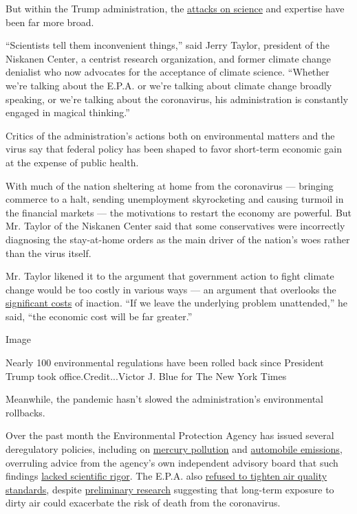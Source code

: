But within the Trump administration, the
\href{https://www.nytimes.com/2019/12/28/climate/trump-administration-war-on-science.html}{attacks
on science} and expertise have been far more broad.

``Scientists tell them inconvenient things,'' said Jerry Taylor,
president of the Niskanen Center, a centrist research organization, and
former climate change denialist who now advocates for the acceptance of
climate science. ``Whether we're talking about the E.P.A. or we're
talking about climate change broadly speaking, or we're talking about
the coronavirus, his administration is constantly engaged in magical
thinking.''

Critics of the administration's actions both on environmental matters
and the virus say that federal policy has been shaped to favor
short-term economic gain at the expense of public health.

With much of the nation sheltering at home from the coronavirus ---
bringing commerce to a halt, sending unemployment skyrocketing and
causing turmoil in the financial markets --- the motivations to restart
the economy are powerful. But Mr. Taylor of the Niskanen Center said
that some conservatives were incorrectly diagnosing the stay-at-home
orders as the main driver of the nation's woes rather than the virus
itself.

Mr. Taylor likened it to the argument that government action to fight
climate change would be too costly in various ways --- an argument that
overlooks the
\href{https://www.nytimes.com/2018/11/19/climate/climate-disasters.html}{significant
costs} of inaction. ``If we leave the underlying problem unattended,''
he said, ``the economic cost will be far greater.''

Image

Nearly 100 environmental regulations have been rolled back since
President Trump took office.Credit...Victor J. Blue for The New York
Times

Meanwhile, the pandemic hasn't slowed the administration's environmental
rollbacks.

Over the past month the Environmental Protection Agency has issued
several deregulatory policies, including on
\href{https://www.nytimes.com/2020/04/16/climate/epa-mercury-coal.html}{mercury
pollution} and
\href{https://www.nytimes.com/2020/03/30/climate/trump-fuel-economy.html}{automobile
emissions}, overruling advice from the agency's own independent advisory
board that such findings
\href{https://yosemite.epa.gov/sab/sabproduct.nsf/MeetingCalBOARD/D87AC6491A9811C1852584CD006F3CC6?OpenDocument}{lacked
scientific rigor}. The E.P.A. also
\href{https://www.nytimes.com/2020/04/14/climate/coronavirus-soot-clean-air-regulations.html}{refused
to tighten air quality standards}, despite
\href{https://www.nytimes.com/2020/04/07/climate/air-pollution-coronavirus-covid.html}{preliminary
research} suggesting that long-term exposure to dirty air could
exacerbate the risk of death from the coronavirus.

